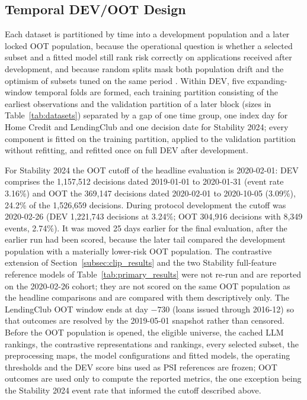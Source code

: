 \documentclass[final,5p,twocolumn]{elsarticle}
\begin{document}
\subsection{Temporal DEV/OOT Design}
\label{subsec:dev_oot}

Each dataset is partitioned by time into a development population and a later locked OOT population, because the operational question is whether a selected subset and a fitted model still rank risk correctly on applications received after development, and because random splits mask both population drift and the optimism of subsets tuned on the same period \cite{bergmeir2012,gama2014}. Within DEV, five expanding-window temporal folds are formed, each training partition consisting of the earliest observations and the validation partition of a later block (sizes in Table~\ref{tab:datasets}) separated by a gap of one time group, one index day for Home Credit and LendingClub and one decision date for Stability 2024; every component is fitted on the training partition, applied to the validation partition without refitting, and refitted once on full DEV after development.

For Stability 2024 the OOT cutoff of the headline evaluation is 2020-02-01: DEV comprises the 1,157,512 decisions dated 2019-01-01 to 2020-01-31 (event rate 3.16\%) and OOT the 369,147 decisions dated 2020-02-01 to 2020-10-05 (3.09\%), 24.2\% of the 1,526,659 decisions. During protocol development the cutoff was 2020-02-26 (DEV 1,221,743 decisions at 3.24\%; OOT 304,916 decisions with 8,349 events, 2.74\%). It was moved 25 days earlier for the final evaluation, after the earlier run had been scored, because the later tail compared the development population with a materially lower-risk OOT population. The contrastive extension of Section~\ref{subsec:clip_results} and the two Stability full-feature reference models of Table~\ref{tab:primary_results} were not re-run and are reported on the 2020-02-26 cohort; they are not scored on the same OOT population as the headline comparisons and are compared with them descriptively only. The LendingClub OOT window ends at day $-730$ (loans issued through 2016-12) so that outcomes are resolved by the 2019-05-01 snapshot rather than censored. Before the OOT population is opened, the eligible universe, the cached LLM rankings, the contrastive representations and rankings, every selected subset, the preprocessing maps, the model configurations and fitted models, the operating thresholds and the DEV score bins used as PSI references are frozen; OOT outcomes are used only to compute the reported metrics, the one exception being the Stability 2024 event rate that informed the cutoff described above.
\end{document}

